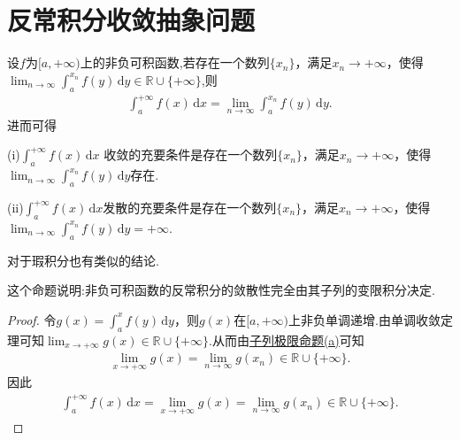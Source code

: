 \documentclass[../../main.tex]{subfiles}%
\begin{document}
\section{反常积分收敛抽象问题}

\begin{proposition}\label{proposition:反常积分收敛的基本结论2}
设$f$为$[a,+\infty)$上的非负可积函数,若存在一个数列$\{x_n\}$，满足$x_n\to+\infty$，使得$\lim_{n\to\infty}\int_a^{x_n}f(y)\,\mathrm{d}y\in \mathbb{R}\cup \{+\infty\}$,则
\begin{align*}
\int_a^{+\infty}f(x)\,\mathrm{d}x=\lim_{n\to\infty}\int_a^{x_n}f(y)\,\mathrm{d}y.
\end{align*}
进而可得

(i)$\int_a^{+\infty}f(x)\,\mathrm{d}x$ 收敛的充要条件是存在一个数列$\{x_n\}$，满足$x_n\to+\infty$，使得$\lim_{n\to\infty}\int_a^{x_n}f(y)\,\mathrm{d}y$存在.

(ii)$\int_a^{+\infty}f(x)\,\mathrm{d}x$发散的充要条件是存在一个数列$\{x_n\}$，满足$x_n\to+\infty$，使得$\lim_{n\to\infty}\int_a^{x_n}f(y)\,\mathrm{d}y=+\infty$.
\end{proposition}
\begin{remark}
对于瑕积分也有类似的结论.
\end{remark}
\begin{note}
这个命题说明:非负可积函数的反常积分的敛散性完全由其子列的变限积分决定.
\end{note}
\begin{proof}

令$g(x)=\int_a^xf(y)\,\mathrm{d}y$，则$g(x)$在$[a,+\infty)$上非负单调递增.由单调收敛定理可知$\lim_{x\to+\infty}g(x)\in\mathbb{R}\cup\{+\infty\}$.从而由\hyperref[proposition:子列极限命题]{子列极限命题(a)}可知
\begin{align*}
\lim_{x\to+\infty}g(x)=\lim_{n\to\infty}g(x_n)\in \mathbb{R}\cup \{+\infty\}.
\end{align*}
因此
\begin{align*}
\int_a^{+\infty}f(x)\,\mathrm{d}x=\lim_{x\to+\infty}g(x)=\lim_{n\to\infty}g(x_n)\in \mathbb{R}\cup \{+\infty\}.
\end{align*}

\end{proof}
\end{document}
